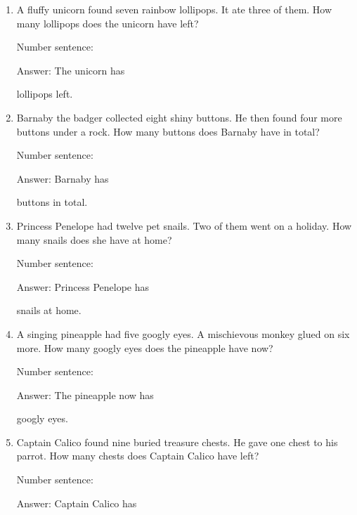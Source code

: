\documentclass{tufte-book}
\begin{document}
\begin{enumerate}

\item
  A fluffy unicorn found seven rainbow lollipops. It ate three of them.
  How many lollipops does the unicorn have left?\medskip\par
  Number sentence:
  \dotfill\medskip\par
  Answer: The unicorn has
  \dotfill\medskip\par\mbox{}\dotfill\medskip\par\mbox{}\dotfill\bigskip
  lollipops left.
\item
  Barnaby the badger collected eight shiny buttons. He then found four
  more buttons under a rock. How many buttons does Barnaby have in
  total?\medskip\par
  Number sentence:
  \dotfill\medskip\par
  Answer: Barnaby has
  \dotfill\medskip\par\mbox{}\dotfill\medskip\par\mbox{}\dotfill\bigskip
  buttons in total.
\item
  Princess Penelope had twelve pet snails. Two of them went on a
  holiday. How many snails does she have at home?\medskip\par
  Number sentence:
  \dotfill\medskip\par
  Answer: Princess Penelope has
  \dotfill\medskip\par\mbox{}\dotfill\medskip\par\mbox{}\dotfill\bigskip
  snails at home.
\item
  A singing pineapple had five googly eyes. A mischievous monkey glued
  on six more. How many googly eyes does the pineapple have now?\medskip\par
  Number sentence:
  \dotfill\medskip\par
  Answer: The pineapple now has
  \dotfill\medskip\par\mbox{}\dotfill\medskip\par\mbox{}\dotfill\bigskip
  googly eyes.
\item
  Captain Calico found nine buried treasure chests. He gave one chest to
  his parrot. How many chests does Captain Calico have left?\medskip\par
  Number sentence:
  \dotfill\medskip\par
  Answer: Captain Calico has
  \dotfill\medskip\par\mbox{}\dotfill\medskip\par\mbox{}\dotfill\bigskip

\end{enumerate}
\end{document}
